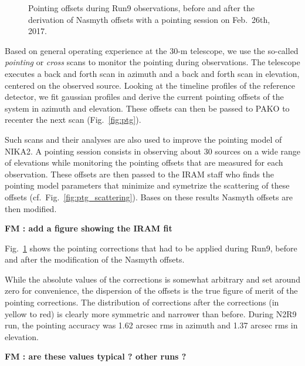 \begin{figure}[p]
\begin{center}
\caption{Pointing offsets during Run9 observations, before and after the
  derivation of Nasmyth offsets with a pointing session on Feb.~26th, 2017.}
\label{fig:pointing_stats_n2r9}
\end{center}
\end{figure}

Based on general operating experience at the 30-m telescope, we use the so-called
{\em pointing} or {\em cross} scans to monitor the pointing during observations. The
telescope executes a back and forth scan in azimuth and a back and forth scan in
elevation, centered on the observed source. Looking at the timeline profiles of
the reference detector, we fit gaussian profiles and derive the current pointing
offsets of the system in azimuth and elevation. These offsets can then be passed
to PAKO to recenter the next scan (Fig.~\ref{fig:ptg}).

Such scans and their analyses are also used to improve the pointing model
of NIKA2. A pointing session consists in observing about 30 sources on a wide
range of elevations while monitoring the pointing offsets that are measured for
each observation. These offsets are then passed to the IRAM staff who finds
the pointing model parameters that minimize and symetrize the scattering of
these offsets (cf.~Fig.~\ref{fig:ptg_scattering}). Bases on these results Nasmyth offsets are then modified. 

{\bf FM : add a figure showing the IRAM fit}

Fig.~\ref{fig:pointing_stats_n2r9} shows
the pointing corrections that had to be applied during Run9, before and after
the modification of the Nasmyth offsets. 




While the absolute values of the
corrections is somewhat arbitrary and set around zero for convenience, the
dispersion of the offsets is the true figure of merit of the pointing
corrections. The distribution of corrections after the corrections (in yellow to
red) is clearly more symmetric and narrower than before. During N2R9 run, the pointing accuracy was
1.62 arcsec rms in azimuth and 1.37 arcsec rms in elevation.


{\bf FM : are these values typical ? other runs ?}\\

